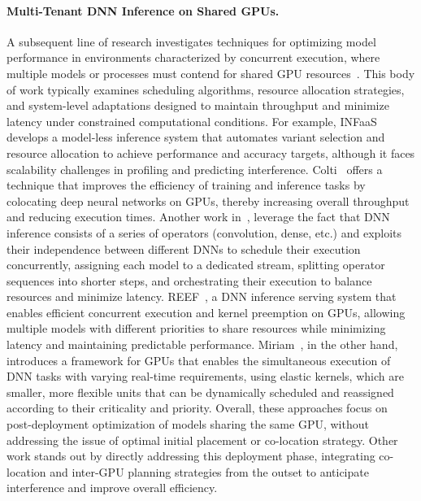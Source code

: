 \paragraph{Multi-Tenant DNN Inference on Shared GPUs.}
A subsequent line of research investigates techniques for optimizing model performance in environments characterized by concurrent execution, where multiple models or processes must contend for shared GPU resources~\cite{mobin2023colti,yu2021automated,zhao2023miriam,francisco2021infaas}. This body of work typically examines scheduling algorithms, resource allocation strategies, and system-level adaptations designed to maintain throughput and minimize latency under constrained computational conditions. For example, INFaaS~\cite{francisco2021infaas} develops a model-less inference system that automates variant selection and resource allocation to achieve performance and accuracy targets, although it faces scalability challenges in profiling and predicting interference. Colti~\cite{mobin2023colti} offers a technique that improves the efficiency of training and inference tasks by colocating deep neural networks on GPUs, thereby increasing overall throughput and reducing execution times. Another work in~\cite{yu2021automated}, leverage the fact that DNN inference consists of a series of operators (convolution, dense, etc.) and exploits their independence between different DNNs to schedule their execution concurrently, assigning each model to a dedicated stream, splitting operator sequences into shorter steps, and orchestrating their execution to balance resources and minimize latency. REEF~\cite{han2022microsecond}, a DNN inference serving system that enables efficient concurrent execution and kernel preemption on GPUs, allowing multiple models with different priorities to share resources while minimizing latency and maintaining predictable performance. Miriam~\cite{zhao2023miriam}, in the other hand, introduces a framework for GPUs that enables the simultaneous execution of DNN tasks with varying real-time requirements, using elastic kernels, which are smaller, more flexible units that can be dynamically scheduled and reassigned according to their criticality and priority. Overall, these approaches focus on post-deployment optimization of models sharing the same GPU, without addressing the issue of optimal initial placement or co-location strategy. Other work stands out by directly addressing this deployment phase, integrating co-location and inter-GPU planning strategies from the outset to anticipate interference and improve overall efficiency.

